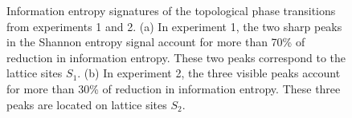 \documentclass[fleqn,10pt]{wlscirep}
\begin{document}
\begin{figure}
\centering
{}\quad
{}\quad
\caption{Information entropy signatures of the topological phase transitions from experiments 1 and 2. (a) In experiment 1, the two sharp peaks in the Shannon entropy signal account for more than 70\% of reduction in information entropy. These two peaks correspond to the lattice sites $S_1$. (b) In experiment 2, the three visible peaks account for more than 30\% of reduction in information entropy. These three peaks are located on lattice sites $S_2$.}
\label{feature_importances}
\end{figure}
\end{document}
